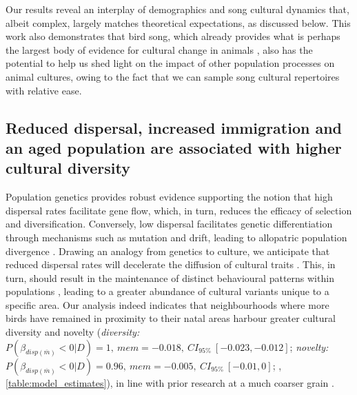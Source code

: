 \documentclass[9pt, twocolumn, twoside]{gsajnl}
\begin{document}
Our results reveal an interplay of demographics and song cultural dynamics that, albeit complex, largely matches theoretical expectations, as discussed below. This work also demonstrates that bird song, which already provides what is perhaps the largest body of evidence for cultural change in animals \parencite{laland2006}, also has the potential to help us shed light on the impact of other population processes on animal cultures, owing to the fact that we can sample song cultural repertoires with relative ease.

\subsection{Reduced dispersal, increased immigration and an aged population are associated with higher cultural diversity}

Population genetics provides robust evidence supporting the notion that high dispersal rates facilitate gene flow, which, in turn, reduces the efficacy of selection and diversification. Conversely, low dispersal facilitates genetic differentiation through mechanisms such as mutation and drift, leading to allopatric population divergence \parencite{suarez2022, claramunt2011, papadopoulou2009}. Drawing an analogy from genetics to culture, we anticipate that reduced dispersal rates will decelerate the diffusion of cultural traits \parencite{nunn2009}. This, in turn, should result in the maintenance of distinct behavioural patterns within populations \parencite{whitehead2012, planque2014}, leading to a greater abundance of cultural variants unique to a specific area. Our analysis indeed indicates that neighbourhoods where more birds have remained in proximity to their natal areas harbour greater cultural diversity and novelty (\textit{diversity:} $P(\beta_{disp (\overline{m})} < 0 | D) = 1,~ mem = -0.018,~CI_{95\%}~[-0.023, -0.012]$; \textit{novelty:} $P(\beta_{disp (\overline{m})} < 0 | D) = 0.96,~ mem = -0.005,~CI_{95\%}~[-0.01, 0]$; , \autoref{table:model_estimates}), in line with prior research at a much coarser grain \parencite{fayet2014}. 
\end{document}
